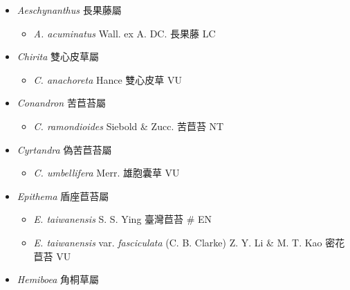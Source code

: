 
  \begin{itemize}
 \item[] \textit{Aeschynanthus} 長果藤屬
                                
  \begin{itemize}
        \item[] \textit{A. acuminatus} Wall. ex A. DC.  長果藤   LC
  \end{itemize}
 \item[] \textit{Chirita} 雙心皮草屬
                                
  \begin{itemize}
        \item[] \textit{C. anachoreta} Hance  雙心皮草   VU
  \end{itemize}
 \item[] \textit{Conandron} 苦苣苔屬
                                
  \begin{itemize}
        \item[] \textit{C. ramondioides} Siebold \& Zucc.  苦苣苔   NT
  \end{itemize}
 \item[] \textit{Cyrtandra} 偽苦苣苔屬
                                
  \begin{itemize}
        \item[] \textit{C. umbellifera} Merr.  雄胞囊草   VU
  \end{itemize}
 \item[] \textit{Epithema} 盾座苣苔屬
                                
  \begin{itemize}
        \item[] \textit{E. taiwanensis} S. S. Ying  臺灣苣苔  \# EN
        \item[] \textit{E. taiwanensis} var. \textit{fasciculata} (C. B. Clarke) Z. Y. Li \& M. T. Kao  密花苣苔   VU
  \end{itemize}
 \item[] \textit{Hemiboea} 角桐草屬
                                

\end{itemize}
